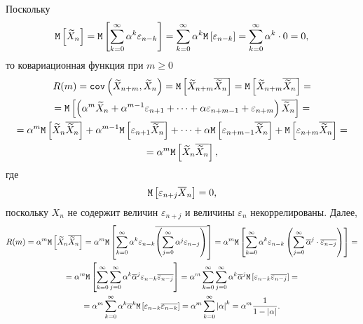 \documentclass[12pt]{article}
\begin{document}
    Поскольку
    \[
        \mathtt{M} \left [ \widetilde{X}_n \right ]
        = \mathtt{M} \left [ \sum_{k=0}^\infty \alpha^k \varepsilon_{n-k} \right ]
        = \sum_{k=0}^\infty \alpha^k \mathtt{M} \left [ \varepsilon_{n-k} \right ]
        = \sum_{k=0}^\infty \alpha^k \cdot 0
        = 0 ,
    \]
    то ковариационная функция при $m \ge 0$
    \begin{multline*}
        R(m)
        = \mathtt{cov} \left ( \widetilde{X}_{n+m}, \widetilde{X}_{n} \right )
        = \mathtt{M} \left [ \widetilde{X}_{n+m} \overline{\widetilde{X}_{n}} \right ]
        = \mathtt{M} \left [ \widetilde{X}_{n+m} \overline{\widetilde{X}_{n}} \right ] = \\
        = \mathtt{M} \left [ \left ( \alpha^m \widetilde{X}_n + \alpha^{m-1} \varepsilon_{n+1} + \dots + \alpha \varepsilon_{n+m-1} + \varepsilon_{n+m} \right ) \overline{\widetilde{X}_{n}} \right ] = \\
        = \alpha^m \mathtt{M} \left [ \widetilde{X}_n \overline{\widetilde{X}_{n}} \right ] + \alpha^{m-1} \mathtt{M} \left [ \varepsilon_{n+1} \overline{\widetilde{X}_{n}} \right ] + \dots + \alpha \mathtt{M} \left [ \varepsilon_{n+m-1} \overline{\widetilde{X}_{n}} \right ] + \mathtt{M} \left [ \varepsilon_{n+m} \overline{\widetilde{X}_{n}} \right ] = \\
        = \alpha^m \mathtt{M} \left [ \widetilde{X}_n \overline{\widetilde{X}_{n}} \right ] ,
    \end{multline*}
    где
    \[
        \mathtt{M} \left [ \varepsilon_{n+j} \overline{X}_n \right ] = 0,
    \]
    поскольку $X_n$ не содержит величин $\varepsilon_{n+j}$ и величины $\varepsilon_n$ некоррелированы. Далее,
    \begin{multline*}
        R(m)
        = \alpha^m \mathtt{M} \left [ \widetilde{X}_n \overline{\widetilde{X}_{n}} \right ]
        = \alpha^m \mathtt{M} \left [ \sum_{k=0}^\infty \alpha^k \varepsilon_{n-k} \overline{ \left ( \sum_{j=0}^\infty \alpha^j \varepsilon_{n-j} \right )} \right ]
        = \alpha^m \mathtt{M} \left [ \sum_{k=0}^\infty \alpha^k \varepsilon_{n-k} \left ( \sum_{j=0}^\infty \overline{\alpha}^j \cdot \overline{\varepsilon_{n-j}} \right ) \right ] = \\
        = \alpha^m \mathtt{M} \left [ \sum_{k=0}^\infty \sum_{j=0}^\infty \alpha^k \overline{\alpha}^j \varepsilon_{n-k} \overline{\varepsilon_{n-j}} \right ]
        = \alpha^m \sum_{k=0}^\infty \sum_{j=0}^\infty \alpha^k \overline{\alpha}^j \mathtt{M} \left [ \varepsilon_{n-k} \overline{\varepsilon_{n-j}} \right ] = \\
        = \alpha^m \sum_{k=0}^\infty \alpha^k \overline{\alpha}^k \mathtt{M} \left [ \varepsilon_{n-k} \overline{\varepsilon_{n-k}} \right ]
        = \alpha^m \sum_{k=0}^\infty \left | \alpha \right |^k
        = \alpha^m \frac{1}{1 - \left | \alpha \right |} .
    \end{multline*}
\end{document}
